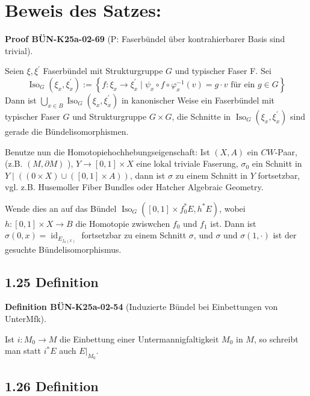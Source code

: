 \documentclass[10pt, letterpaper]{article}
\newcommand{\CustomHeading}[3]{%
  \par\medskip\noindent%
  \textbf{#1 #2} \textnormal{(#3)}.\enskip%
}
\newenvironment{DEF}[2]{\begin{unitbox}\CustomHeading{Definition}{#1}{#2}}{\end{unitbox}}
\newenvironment{PROOF}[2]{\begin{unitbox}\CustomHeading{Proof}{#1}{#2}}{\end{unitbox}}
\begin{document}
\section*{Beweis des Satzes:}

\begin{PROOF}{BÜN-K25a-02-69}{P: Faserbündel über kontrahierbarer Basis sind trivial}
Seien $\xi, \xi^{\prime}$ Faserbündel mit Strukturgruppe $G$ und typischer Faser F. Sei
$$
\operatorname{Iso}_{G}\left(\xi_{x}, \xi_{x}^{\prime}\right):=\left\{f: \xi_{x} \rightarrow \xi_{x}^{\prime} \mid \psi_{x} \circ f \circ \varphi_{x}^{-1}(v)=g \cdot v \text { für ein } g \in G\right\}
$$
Dann ist $\bigcup_{x \in B} \operatorname{Iso}_{G}\left(\xi_{x}, \xi_{x}^{\prime}\right)$ in kanonischer Weise ein Faserbündel mit typischer Faser $G$ und Strukturgruppe $G \times G$, die Schnitte in $\operatorname{Iso}_{G}\left(\xi_{x}, \xi_{x}^{\prime}\right)$ sind gerade die Bündelisomorphismen. 

Benutze nun die Homotopiehochhebungseigenschaft: Ist $(X, A)$ ein $CW$-Paar, (z.B. $(M, \partial M)$ ), $Y \rightarrow[0,1] \times X$ eine lokal triviale Faserung, $\sigma_{0}$ ein Schnitt in $Y \mid((0 \times X) \cup([0,1] \times A))$, dann ist $\sigma$ zu einem Schnitt in $Y$ fortsetzbar, vgl. z.B. Husemoller Fiber Bundles oder Hatcher Algebraic Geometry.

Wende dies an auf das Bündel $\operatorname{Iso}_{G}\left([0,1] \times f_{0}^{*} E, h^{*} E\right)$, wobei $h:[0,1] \times X \rightarrow B$ die Homotopie zwiswchen $f_{0}$ und $f_{1}$ ist. Dann ist $\sigma(0, x)=\operatorname{id}_{E_{f_{0}(x)}}$ fortsetzbar zu einem Schnitt $\sigma$, und $\sigma$ und $\sigma(1, \cdot)$ ist der gesuchte Bündelisomorphismus.
\end{PROOF}

\subsection*{1.25 Definition}

\begin{DEF}{BÜN-K25a-02-54}{Induzierte Bündel bei Einbettungen von UnterMfk}
Ist $i: M_{0} \rightarrow M$ die Einbettung einer Untermannigfaltigkeit $M_{0}$ in $M$, so schreibt man statt $i^{*} E$ auch $\left.E\right|_{M_{0}}$.
\end{DEF}

\subsection*{1.26 Definition}
\end{document}
